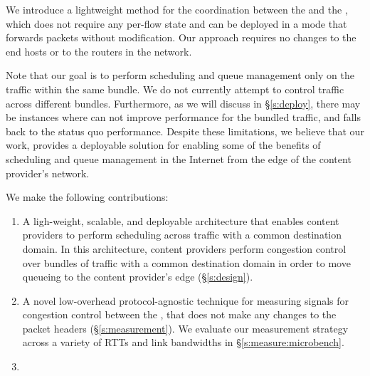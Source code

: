 We introduce a lightweight method for the coordination between the \inbox and the \outbox, which does not require any per-flow state and can be deployed in a mode that forwards packets without modification. Our approach requires no changes to the end hosts or to the routers in the network.
 
Note that our goal is to perform scheduling and queue management only on the traffic within the same bundle. We do not currently attempt to control traffic across different bundles. 
Furthermore, as we will discuss in \S\ref{s:deploy}, there may be instances where \name can not improve performance for the bundled traffic, and falls back to the status quo performance. 
Despite these limitations, we believe that our work, provides a deployable solution for enabling some of the benefits of scheduling and queue management in the Internet from the edge of the content provider's network.
 
We make the following contributions:
\begin{enumerate}
    \item A ligh-weight, scalable, and deployable architecture that enables content providers to perform scheduling across traffic with a common destination domain. In this architecture, content providers perform congestion control over bundles of traffic with a common destination domain in order to move queueing to the content provider's edge (\S\ref{s:design}).
     \item A novel low-overhead protocol-agnostic technique for measuring signals for congestion control between the \pair, that does not make any changes to the packet headers (\S\ref{s:measurement}). We evaluate our measurement strategy across a variety of RTTs and link bandwidths in \S\ref{s:measure:microbench}. 
     \item {}
\end{enumerate}
